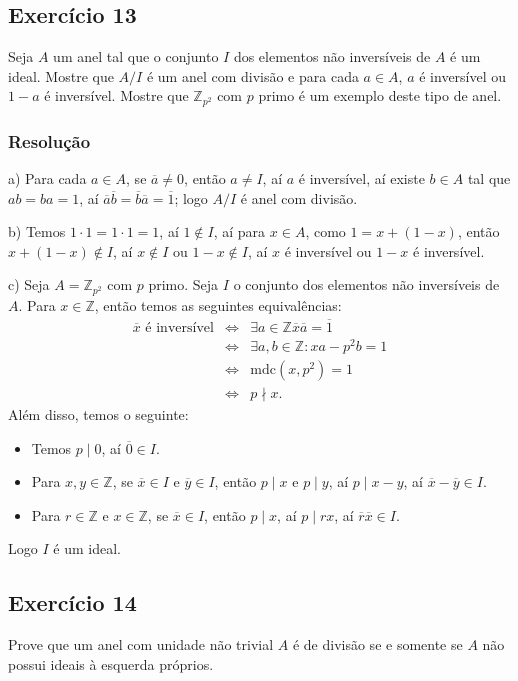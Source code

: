 \documentclass[10pt,a4paper]{article}
\begin{document}
\subsection*{Exercício 13}
Seja $A$ um anel tal que o conjunto $I$ dos elementos não inversíveis de $A$ é um ideal. Mostre que $A/I$ é um anel com divisão e para cada $a\in A$, $a$ é inversível ou $1-a$ é inversível. Mostre que $\mathbb{Z}_{p^2}$ com $p$ primo é um exemplo deste tipo de anel.

\subsubsection*{Resolução}

a) Para cada $a\in A$, se $\overline{a}\neq 0$, então $a\neq I$, aí $a$ é inversível, aí existe $b\in A$ tal que $ab=ba=1$, aí $\overline{a}\overline{b}=\overline{b}\overline{a}=\overline{1}$; logo $A/I$ é anel com divisão.

\medskip
\noindent
b) Temos $1\cdot 1=1\cdot 1=1$, aí $1\notin I$, aí para $x\in A$, como $1=x+(1-x)$, então $x+(1-x)\notin I$, aí $x\notin I$ ou $1-x\notin I$, aí $x$ é inversível ou $1-x$ é inversível.

\medskip
\noindent
c) Seja $A=\mathbb{Z}_{p^2}$ com $p$ primo. Seja $I$ o conjunto dos elementos não inversíveis de $A$. Para $x\in\mathbb{Z}$, então temos as seguintes equivalências:
\[
\begin{array}{rcl}
\overline{x}\text{ é inversível}&\Leftrightarrow&\exists a\in\mathbb{Z}\overline{x}\overline{a}=\overline{1}\\&\Leftrightarrow&\exists a,b\in\mathbb{Z}:xa-p^2b=1\\&\Leftrightarrow&\mathrm{mdc}(x,p^2)=1\\&\Leftrightarrow&p\nmid x.
\end{array}
\]
Além disso, temos o seguinte:
\begin{itemize}
\item Temos $p\mid 0$, aí $\overline{0}\in I$.
\item Para $x,y\in\mathbb{Z}$, se $\overline{x}\in I$ e $\overline{y}\in I$, então $p\mid x$ e $p\mid y$, aí $p\mid x-y$, aí $\overline{x}-\overline{y}\in I$.
\item Para $r\in\mathbb{Z}$ e $x\in\mathbb{Z}$, se $\overline{x}\in I$, então $p\mid x$, aí $p\mid rx$, aí $\overline{r}\overline{x}\in I$.
\end{itemize}
Logo $I$ é um ideal.

\subsection*{Exercício 14}
Prove que um anel com unidade não trivial $A$ é de divisão se e somente se $A$ não possui ideais à esquerda próprios.
\end{document}
